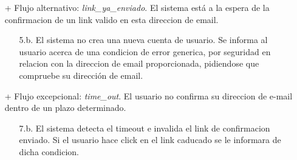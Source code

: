 \documentclass[a4paper]{report}
\begin{document}
\begin{itemize}
\begin{itemize}
                        Por razones de seguridad, la manera en que el sistema informa al usuario tras esta situacion es indistinguible del flujo principal,
                        de forma que no se pueda deducir que ese email ya tiene cuenta asociada en el sistema.
                    \end{itemize}
                    \item[+] Flujo alternativo: \emph{link\_ya\_enviado}. El sistema est\'a a la espera de la confirmacion de un link valido en esta direccion de email.
                    \begin{itemize}
                        \item[5.b.] El sistema no crea una nueva cuenta de usuario. Se informa al usuario acerca de una condicion de error \-{}generica, por seguridad\- en relacion
                        con la direccion de email proporcionada, pidiendose que compruebe su direcci\'on de email.
                    \end{itemize}
                    \item[+] Flujo excepcional: \emph{time\_out}. El usuario no confirma su direccion de e-mail dentro de un plazo determinado.
                    \begin{itemize}
                        \item[7.b.] El sistema detecta el timeout e invalida el link de confirmacion enviado. Si el usuario hace click en el link caducado se le informara de dicha condicion.
                    \end{itemize}
                \end{itemize}
\end{document}
